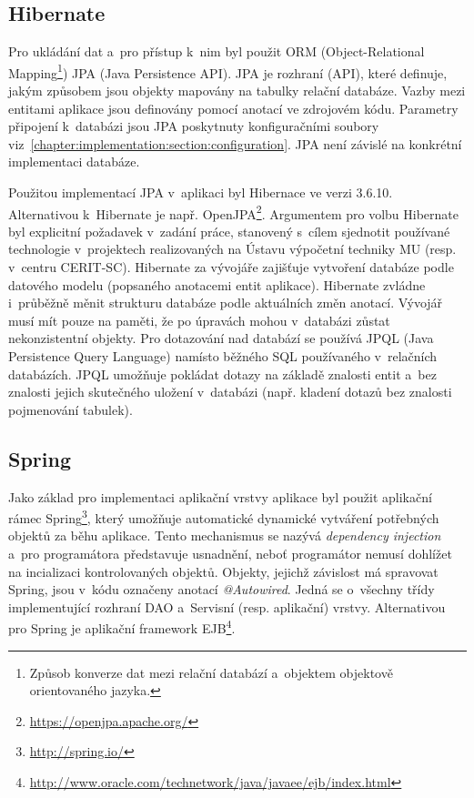 \documentclass[11pt, draft, oneside]{fithesis2}
\begin{document}
\subsection{Hibernate}
Pro ukládání dat a~pro přístup k~nim byl použit ORM (Object-Relational Mapping\footnote{Způsob konverze dat mezi relační databází a~objektem objektově orientovaného jazyka.}) JPA (Java Persistence API). JPA je rozhraní (API), které definuje, jakým způsobem jsou objekty mapovány na tabulky relační databáze. Vazby mezi entitami aplikace jsou definovány pomocí anotací ve zdrojovém kódu. Parametry připojení k~databázi jsou JPA poskytnuty konfiguračními soubory viz~\ref{chapter:implementation:section:configuration}. JPA není závislé na konkrétní implementaci databáze.

Použitou implementací JPA v~aplikaci byl Hibernace ve verzi 3.6.10. Alternativou k~Hibernate je např. OpenJPA\footnote{\url{https://openjpa.apache.org/}}. Argumentem pro volbu Hibernate byl explicitní požadavek v~zadání práce, stanovený s~cílem sjednotit používané technologie v~projektech realizovaných na Ústavu výpočetní techniky MU (resp. v~centru CERIT-SC). 
Hibernate za vývojáře zajišťuje vytvoření databáze podle datového modelu (popsaného anotacemi entit aplikace). Hibernate zvládne i~průběžně měnit strukturu databáze podle aktuálních změn anotací. Vývojář musí mít pouze na paměti, že po úpravách mohou v~databázi zůstat nekonzistentní objekty.
Pro dotazování nad databází se používá JPQL (Java Persistence Query Language) namísto běžného SQL používaného v~relačních databázích. JPQL umožňuje pokládat dotazy na základě znalosti entit a~bez znalosti jejich skutečného uložení v~databázi (např. kladení dotazů bez znalosti pojmenování tabulek).

\subsection{Spring}
Jako základ pro implementaci aplikační vrstvy aplikace byl použit aplikační rámec Spring\footnote{\url{http://spring.io/}}, který umožňuje automatické dynamické vytváření potřebných objektů za běhu aplikace. Tento mechanismus se nazývá \textit{dependency injection} a~pro programátora představuje usnadnění, neboť programátor nemusí dohlížet na incializaci kontrolovaných objektů. Objekty, jejichž závislost má spravovat Spring, jsou v~kódu označeny anotací \textit{@Autowired}. Jedná se o~všechny třídy implementující rozhraní DAO a~Servisní (resp. aplikační) vrstvy.
Alternativou pro Spring je aplikační framework EJB\footnote{\url{http://www.oracle.com/technetwork/java/javaee/ejb/index.html}}.
\end{document}
